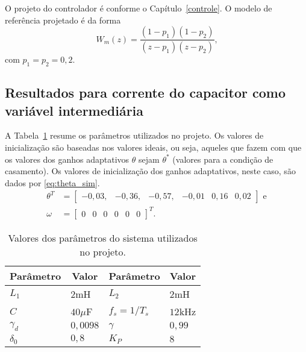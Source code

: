   O projeto do controlador é conforme o Capítulo~\ref{controle}. O modelo de referência projetado é da forma
  \begin{equation}
    W_m(z) = \frac{(1-p_1)(1-p_2)}{(z-p_1)(z-p_2)}\text{,}
    \label{eq:wm_simulacao}
  \end{equation}
  com $p_1 = p_2 = 0,2$.

  \subsection{Resultados para corrente do capacitor como variável intermediária}

	A Tabela~\ref{tab:parametros_projeto} resume os parâmetros utilizados no projeto. Os valores de inicialização são baseadas nos valores ideais, ou seja, aqueles que fazem com que os valores dos ganhos adaptativos $\theta$ sejam $\theta^*$ (valores para a condição de casamento). Os valores de inicialização dos ganhos adaptativos, neste caso, são dados por \ref{eq:theta_sim}.
  \begin{equation}
    \begin{split}
      \theta^T & = \left[ \begin{matrix} -0,03, & -0,36, & -0,57, & -0,01 & 0,16 & 0,02 \end{matrix} \right]\text{ e}\\
      \omega & = {\left[ \begin{matrix} 0 & 0 & 0 & 0 & 0 & 0 \end{matrix} \right]}^T\text{.}
    \end{split}
    \label{eq:theta_sim}
  \end{equation}

  \begin{table}[htb]
    \renewcommand{\arraystretch}{1.35}
    \setlength{\tabcolsep}{1.2mm}
    \caption{Valores dos parâmetros do sistema utilizados no projeto.}
    \label{tab:parametros_projeto}
    \centering
    \begin{tabular}{l l l l}
      \hline
      \multicolumn{1}{c}{Parâmetro} & \multicolumn{1}{c}{Valor} &
      \multicolumn{1}{c}{Parâmetro} & \multicolumn{1}{c}{Valor} \\
      \hline
      $L_1$      & $2$mH    & $L_2$         & $2$mH   \\
      $C$        & $40\mu$F & $f_s = 1/T_s$ & $12$kHz \\
      $\gamma_d$ & $0,0098$ & $\gamma$      & $0,99$  \\
      $\delta_0$ & $0,8$    & $K_P$         & $8$     \\
      \hline
    \end{tabular}
  \end{table}

